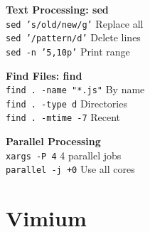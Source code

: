 \documentclass[11pt,landscape,a4paper]{article}
\begin{document}
\begin{multicols}{3}
\begin{devbox}
\textbf{Text Processing: sed}\\
\texttt{sed 's/old/new/g'}\,\textemdash\,Replace all\\
\texttt{sed '/pattern/d'}\,\textemdash\,Delete lines\\
\texttt{sed -n '5,10p'}\,\textemdash\,Print range
\end{devbox}

\begin{devbox}
\textbf{Find Files: find}\\
\texttt{find . -name "*.js"}\,\textemdash\,By name\\
\texttt{find . -type d}\,\textemdash\,Directories\\
\texttt{find . -mtime -7}\,\textemdash\,Recent
\end{devbox}

\begin{devbox}
\textbf{Parallel Processing}\\
\texttt{xargs -P 4}\,\textemdash\,4 parallel jobs\\
\texttt{parallel -j +0}\,\textemdash\,Use all cores
\end{devbox}

\section*{Vimium}


\end{multicols}
\end{document}
